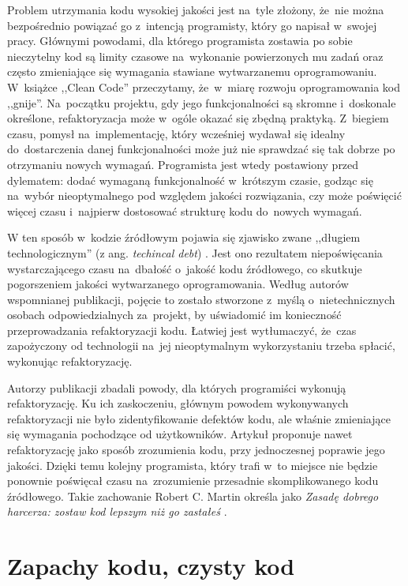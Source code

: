 \documentclass[twoside]{praca}
\begin{document}
Problem utrzymania kodu wysokiej jakości jest na~tyle złożony, że~nie można bezpośrednio powiązać go z~intencją programisty, który go napisał w~swojej pracy. Głównymi powodami, dla którego programista zostawia po sobie nieczytelny kod są limity czasowe na~wykonanie powierzonych mu zadań oraz często zmieniające się wymagania stawiane wytwarzanemu oprogramowaniu. W~książce ,,Clean Code'' \cite{martin2009clean} przeczytamy, że~w~miarę rozwoju oprogramowania kod ,,gnije''. Na~początku projektu, gdy jego funkcjonalności są skromne i~doskonale określone, refaktoryzacja może w~ogóle okazać się zbędną praktyką. Z~biegiem czasu, pomysł na~implementację, który wcześniej wydawał się idealny do~dostarczenia danej funkcjonalności może już nie sprawdzać się tak dobrze po otrzymaniu nowych wymagań. Programista jest wtedy postawiony przed dylematem: dodać wymaganą funkcjonalność w~krótszym czasie, godząc się na~wybór nieoptymalnego pod względem jakości rozwiązania, czy może poświęcić więcej czasu i~najpierw dostosować strukturę kodu do~nowych wymagań.

W ten sposób w~kodzie źródłowym pojawia się zjawisko zwane ,,długiem technologicznym'' (z ang. \textit{techincal debt}) \cite{kruchten2012technical}. Jest ono rezultatem niepoświęcania wystarczającego czasu na~dbałość o~jakość kodu źródłowego, co skutkuje pogorszeniem jakości wytwarzanego oprogramowania. Według autorów wspomnianej publikacji, pojęcie to zostało stworzone z~myślą o~nietechnicznych osobach odpowiedzialnych za~projekt, by uświadomić im konieczność przeprowadzania refaktoryzacji kodu. Łatwiej jest wytłumaczyć, że~czas zapożyczony od technologii na~jej nieoptymalnym wykorzystaniu trzeba spłacić, wykonując refaktoryzację.

Autorzy publikacji \cite{silva2016we} zbadali powody, dla których programiści wykonują refaktoryzację. Ku ich zaskoczeniu, głównym powodem wykonywanych refaktoryzacji nie było zidentyfikowanie defektów kodu, ale właśnie zmieniające się wymagania pochodzące od użytkowników. Artykuł \cite{du2005does} proponuje nawet refaktoryzację jako sposób zrozumienia kodu, przy jednoczesnej poprawie jego jakości. Dzięki temu kolejny programista, który trafi w~to miejsce nie będzie ponownie poświęcał czasu na~zrozumienie przesadnie skomplikowanego kodu źródłowego. Takie zachowanie Robert C. Martin określa jako \textit{Zasadę dobrego harcerza: zostaw kod lepszym niż go zastałeś} \cite{martin2009clean}.



\section{Zapachy kodu, czysty kod}
\label{sec:existing:smells}
\end{document}
